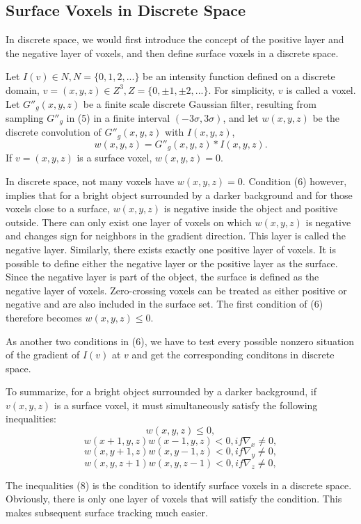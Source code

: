 \documentclass{article}
\begin{document}
\subsection{Surface Voxels in Discrete Space}
In discrete space, we would first introduce the concept of the positive layer
and the negative layer of voxels, and then define surface voxels in a discrete
space.\par
Let $I(v) \in N, N = \{0,1,2,...\}$ be an intensity function defined on a discrete
domain, $v=(x,y,z) \in Z^3,Z = \{0,\pm 1,\pm 2,...\}$. For simplicity, $v$ is called
a voxel. Let $G''_g(x, y, z)$ be a finite scale discrete Gaussian filter,
resulting from sampling $G''_g$ in (5) in a finite interval
$(-3\sigma,3\sigma)$, and let $w(x, y, z)$ be the discrete convolution of
$G''_g(x,y,z)$ with $I(x, y, z)$,
\begin{equation}
  w(x,y,z) = G''_g(x,y,z)*I(x,y,z).
\end{equation}
If $v=(x,y,z)$ is a surface voxel, $w(x,y,z)=0.$\par
In discrete space, not many voxels have $w(x,y,z)=0.$ Condition (6) however,
implies that for a bright object surrounded by a darker background and for those
voxels close to a surface, $w(x, y, z)$ is negative inside the object and
positive outside. There can only exist one layer of voxels on which $w(x, y, z)$
is negative and changes sign for neighbors in the gradient direction. This layer
is called the negative layer. Similarly, there exists exactly one positive layer
of voxels. It is possible to define either the negative layer or the positive
layer as the surface. Since the negative layer is part of the object, the
surface is defined as the negative layer of voxels. Zero-crossing voxels can be
treated as either positive or negative and are also included in the surface
set. The first condition of (6) therefore becomes $w(x, y, z) \leq 0$.\par
As another two conditions in (6), we have to test every possible nonzero situation of
the gradient of $I(v)$ at $v$ and get the corresponding conditons in discrete
space. \par
To summarize, for a bright object surrounded by a darker background, if $v(x, y,
z)$ is a surface voxel, it must simultaneously satisfy the following
inequalities:
\begin{equation*}
  w(x,y,z) \leq 0,
\end{equation*}
\begin{equation}
  w(x+1,y,z)w(x-1,y,z)<0, if\nabla_x \neq 0,
\end{equation}
\begin{equation*}
  w(x,y+1,z)w(x,y-1,z)<0, if\nabla_y \neq 0,
\end{equation*}
\begin{equation*}
  w(x,y,z+1)w(x,y,z-1)<0, if\nabla_z \neq 0,
\end{equation*}\par
The inequalities (8) is the condition to identify surface voxels in a discrete
space. Obviously, there is only one layer of voxels that will satisfy the
condition. This makes subsequent surface tracking much easier.
\end{document}
